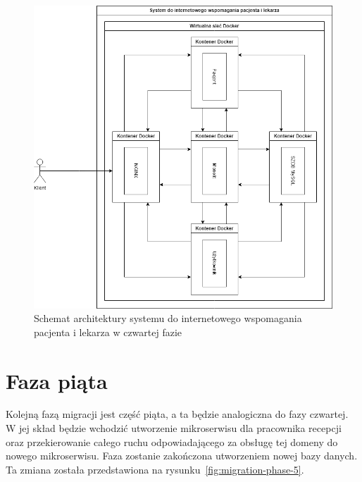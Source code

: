 \documentclass[12pt,twoside]{book}
\newcommand{\captionvspace}{\vspace{6pt}}
\begin{document}
    \begin{figure}[ht]
        \centering
        \includegraphics[width=\textwidth]{includes/images/migration-phase-4.png}
        \captionvspace
        \caption{Schemat architektury systemu do internetowego wspomagania pacjenta i lekarza w czwartej fazie}
        \label{fig:migration-phase-4}
    \end{figure}


    \section{Faza piąta}
    Kolejną fazą migracji jest część piąta, a ta będzie analogiczna do fazy czwartej. W jej skład będzie wchodzić utworzenie mikroserwisu dla pracownika recepcji oraz przekierowanie całego ruchu odpowiadającego za obsługę tej domeny do nowego mikroserwisu. Faza zostanie zakończona utworzeniem nowej bazy danych. Ta zmiana została przedstawiona na rysunku~\ref{fig:migration-phase-5}.
\end{document}
